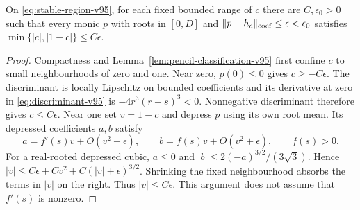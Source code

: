 \begin{lemma}\label{lem:robust-pencil-v95}
On \eqref{eq:stable-region-v95}, for each fixed bounded range of $c$
there are $C,\epsilon_0>0$ such that every monic $p$ with roots in
$[0,D]$ and $\|p-h_c\|_{\rm coef}\le\epsilon<\epsilon_0$ satisfies
$\min\{|c|,|1-c|\}\le C\epsilon$.
\end{lemma}
\begin{proof}
Compactness and Lemma~\ref{lem:pencil-classification-v95} first confine
$c$ to small neighbourhoods of zero and one. Near zero, $p(0)\le0$
gives $c\ge-C\epsilon$. The discriminant is locally Lipschitz on
bounded coefficients and its derivative at zero in
\eqref{eq:discriminant-v95} is $-4r^3(r-s)^3<0$. Nonnegative
discriminant therefore gives $c\le C\epsilon$.
Near one set $v=1-c$ and depress $p$ using its own root mean. Its
depressed coefficients $a,b$ satisfy
\[
 a=f'(s)v+O(v^2+\epsilon),\qquad
 b=f(s)v+O(v^2+\epsilon),\qquad f(s)>0.
\]
For a real-rooted depressed cubic, $a\le0$ and
$|b|\le2(-a)^{3/2}/(3\sqrt3)$. Hence
$|v|\le C\epsilon+C v^2+C(|v|+\epsilon)^{3/2}$.
Shrinking the fixed neighbourhood absorbs the terms in $|v|$ on the
right. Thus $|v|\le C\epsilon$. This argument does not assume that
$f'(s)$ is nonzero.
\end{proof}

